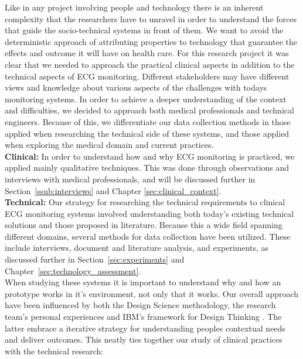 Like in any project involving people and technology there is an inherent complexity that the researchers have to unravel in order to understand the forces that guide the socio-technical systems in front of them. We want to avoid the deterministic approach of attributing properties to technology that guarantee the effects and outcome it will have on health care. For this research project it was clear that we needed to approach the practical clinical aspects in addition to the technical aspects of ECG monitoring. Different stakeholders may have different views and knowledge about various aspects of the challenges with todays monitoring systems. In order to achieve a deeper understanding of the context and difficulties, we decided to approach both medical professionals and technical engineers. Because of this, we differentiate our data collection methods in those applied when researching the technical side of these systems, and those applied when exploring the medical domain and current practices.\\
\newline
\noindent
\textbf{Clinical:} In order to understand how and why ECG monitoring is practiced, we applied mainly qualitative techniques. This was done through observations and interviews with medical professionals, and will be discussed further in Section~\ref{ssub:interviews} and Chapter \ref{sec:clinical_context}.\\
\newline
\noindent
\textbf{Technical:} Our strategy for researching the technical requirements to clinical ECG monitoring systems involved understanding both today's existing technical solutions and those proposed in literature. Because this a wide field spanning different domains, several methods for data collection have been utilized. These include interviews, document and literature analysis, and experiments, as discussed further in Section~\ref{sec:experiments} and Chapter~\ref{sec:technology_assessment}.
\\
\newline
\noindent
When studying these systems it is important to understand why and how an prototype works in it's environment, not only that it works. Our overall approach have been influenced by both the Design Science methodology, the research team's personal experiences and IBM's framework for Design Thinking \cite{ibmDesignThinking}. The latter embrace a iterative strategy for understanding peoples contextual needs and deliver outcomes. This neatly ties together our study of clinical practices with the technical research:

